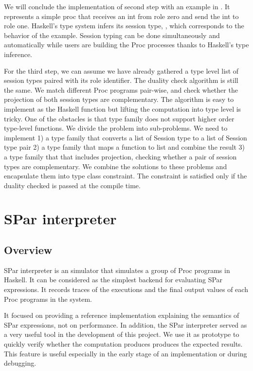 We will conclude the implementation of second step with an example in . It represents a simple proc that receives an int from role zero and send the int to role one. Haskell's type system infers its session type,  , which corresponds to the behavior of the example. Session typing can be done simultaneously and automatically while users are building the Proc processes thanks to Haskell's type inference.

For the third step, we can assume we have already gathered a type level list of session types paired  with its role identifier. The duality check algorithm is still the same. We match different Proc programs pair-wise, and check whether the projection of both session types are complementary. The algorithm is easy to implement as the Haskell function but lifting the computation into type level is tricky. One of the obstacles is that type family does not support higher order type-level functions. We divide the problem into sub-problems. We need to implement 1) a type family that converts a list of Session type to a list of Session type pair 2) a type family that maps a function to list and combine the result 3) a type family that that includes projection, checking whether a pair of session types are complementary. We combine the solutions to these problems and encapsulate them into type class constraint. The constraint is satisfied only if the duality checked is passed at the compile time. 

\section{SPar interpreter} \label{impl:sec:interp}
\subsection{Overview}
SPar interpreter is an simulator that simulates a group of Proc programs in Haskell. It can be considered as the simplest backend for evaluating SPar expressions. It records traces of the executions and the final output values of each Proc programs in the system. 

It focused on providing a reference implementation explaining the semantics of SPar expressions, not on performance. In addition, the SPar interpreter served as a very useful tool in the development of this project. We use it as prototype to quickly verify whether the computation produces produces the expected results. This feature is useful especially in the early stage of an implementation or during debugging.
